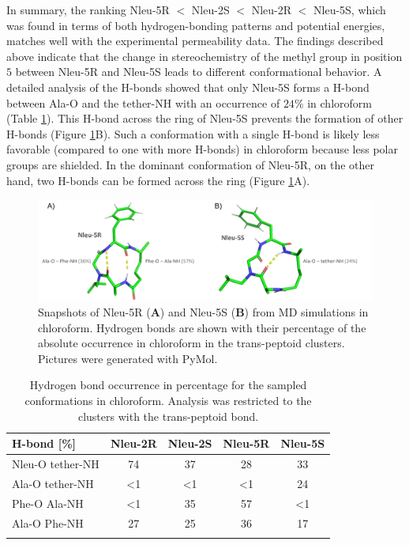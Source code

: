 In summary, the ranking Nleu-5R $<$ Nleu-2S $<$ Nleu-2R $<$ Nleu-5S, which was found in terms of both hydrogen-bonding patterns and potential energies, matches well with the experimental permeability data.
The findings described above indicate that the change in stereochemistry of the methyl group in position $5$ between Nleu-5R and Nleu-5S leads to different conformational behavior. 
A detailed analysis of the H-bonds showed that only Nleu-5S forms a H-bond between Ala-O and the tether-NH with an occurrence of $24\%$ in chloroform (Table \ref{tab: hbondsrationCLCH3}). 
This H-bond across the ring of Nleu-5S prevents the formation of other H-bonds (Figure \ref{fig: HbondExamples}B).
Such a conformation with a single H-bond is likely less favorable (compared to one with more H-bonds) in chloroform because less polar groups are shielded. In the dominant conformation of Nleu-5R, on the other hand, two H-bonds can be formed across the ring (Figure \ref{fig: HbondExamples}A).

\begin{figure}[h!]
    \centering
    \includegraphics[width=\textwidth]{fig/results/ExampleHbonds.png}
    \caption{Snapshots of Nleu-5R (\textbf{A}) and Nleu-5S (\textbf{B}) from MD simulations in chloroform. Hydrogen bonds are shown with their percentage of the absolute occurrence in chloroform in the trans-peptoid clusters. Pictures were generated with PyMol. \cite{Delano2020}}
    \label{fig: HbondExamples}
\end{figure}

\begin{table}[h!]
    \centering
    \caption{Hydrogen bond occurrence in percentage for the sampled conformations in chloroform. Analysis was restricted to the clusters with the trans-peptoid bond.}
    \label{tab: hbondsrationCLCH3}
    \begin{adjustbox}{max width=\textwidth}
    \begin{tabular}{lcccc}
    H-bond  [\%] &	Nleu-2R &	Nleu-2S &	Nleu-5R &	Nleu-5S  \\
    \hline
    Nleu-O tether-NH &	74 &	37 &	28 &	33 \\
    Ala-O tether-NH &	\textless{}1 & \textless{}1 &	\textless{}1 &	24 \\
    Phe-O Ala-NH    &	\textless{}1 &	35 &	57 &	\textless{}1 \\
    Ala-O Phe-NH    &	27 &	25 &	36 &	17 \\
    \hline\\
    \end{tabular}
    \end{adjustbox}
\end{table}


